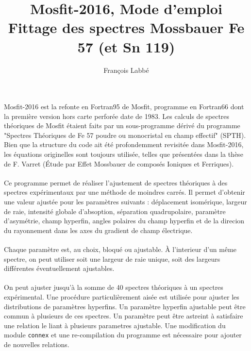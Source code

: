 \documentclass[a4paper]{article}
\begin{document}
\title{Mosfit-2016, Mode d'emploi \\Fittage des spectres Mossbauer Fe 57 (et Sn 119)}
\author{Fran\c{c}ois Labb\'e}
\maketitle

\paragraph{}
Mosfit-2016 est la refonte en Fortran95 de Mosfit, programme en Fortran66 dont la première version hors carte perforée date de 1983.
Les calculs de spectres théoriques de Mosfit étaient faits par un sous-programme dérivé du programme "Spectres Théoriques de Fe 57 poudre ou monocristal en champ effectif" (SPTH). 
Bien que la structure du code ait été profondemment revisitée dans Mosfit-2016, les équations originelles sont toujours utilisée, telles que présentées dans la thèse de F. Varret (\'Etude par Effet Mossbauer de composés Ioniques et Ferriques).


\paragraph{}
Ce programme permet de réaliser l'ajustement de spectres théoriques à des spectres expérimentaux par une méthode de moindres carrés.
Il permet d'obtenir une valeur ajustée pour les paramètres suivants : déplacement isomérique, largeur de raie, intensité globale d'absoption, 
séparation quadrupolaire, paramètre d'asymétrie, champ hyperfin, angles polaires du champ hyperfin et de la direcion du rayonnement dans les axes du gradient de champ électrique.

\paragraph{}
Chaque paramètre est, au choix, bloqué ou ajustable. À l'interieur d'un même spectre, on peut utiliser soit une largeur de raie unique, soit des largeurs différentes éventuellement ajustables. 

\paragraph{}
On peut ajuster jusqu'à la somme de 40 spectres théoriques à un spectres expérimental.
 Une procédure particulièrement aisée est utilisée pour ajuster les distributions de paramètres hyperfins.
 Un paramètre hyperfin ajustable peut être commun à plusieurs de ces spectres.
 Un paramètre peut être astreint à satisfaire une relation le liant à plusieurs parametres ajustable.
 Une modification du module \lstinline{connex} et une re-compilation du programme est nécessaire pour ajouter de nouvelles relations.
 
\end{document}
